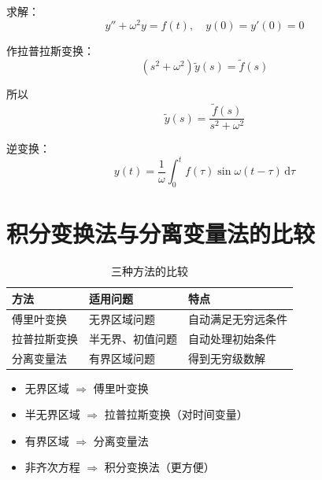 \begin{lizi}{}{}
求解：
\begin{equation}
    y'' + \omega^2 y = f(t), \quad y(0) = y'(0) = 0
\end{equation}

\begin{jie}
    作拉普拉斯变换：
    \begin{equation}
        (s^2 + \omega^2)\tilde{y}(s) = \tilde{f}(s)
    \end{equation}
    
    所以
    \begin{equation}
        \tilde{y}(s) = \frac{\tilde{f}(s)}{s^2 + \omega^2}
    \end{equation}
    
    逆变换：
    \begin{equation}
        y(t) = \frac{1}{\omega}\int_0^t f(\tau)\sin\omega(t-\tau)\,\mathrm{d}\tau
    \end{equation}
\end{jie}
\end{lizi}

\section{积分变换法与分离变量法的比较}

\begin{table}[htbp]
\centering
\begin{tabular}{lll}
\toprule
\textbf{方法} & \textbf{适用问题} & \textbf{特点} \\
\midrule
傅里叶变换\index{傅里叶变换} & 无界区域问题 & 自动满足无穷远条件 \\
拉普拉斯变换\index{拉普拉斯变换} & 半无界、初值问题 & 自动处理初始条件 \\
分离变量法\index{分离变量法} & 有界区域问题 & 得到无穷级数解 \\
\bottomrule
\end{tabular}
\caption{三种方法的比较}
\end{table}

\begin{jinshi}[方法选择]
\begin{itemize}
    \item 无界区域 $\Rightarrow$ 傅里叶变换
    \item 半无界区域 $\Rightarrow$ 拉普拉斯变换（对时间变量）
    \item 有界区域 $\Rightarrow$ 分离变量法
    \item 非齐次方程 $\Rightarrow$ 积分变换法（更方便）
\end{itemize}
\end{jinshi}

